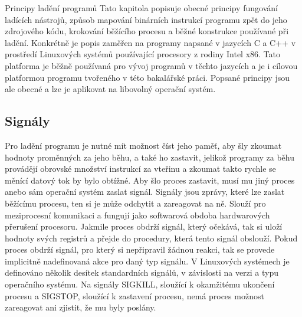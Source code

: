 \documentclass[bc,male,python,dept460]{diploma}						%
\begin{document}
\begin{section}{Principy ladění programů}
\label{sec:DebuggingPrinciples}
	Tato kapitola popisuje obecné principy fungování ladících nástrojů, způsob mapování binárních instrukcí programu zpět do jeho zdrojového kódu,
	krokování běžícího procesu a běžné konstrukce používané při ladění. Konkrétně je popis zaměřen na programy napsané v jazycích C a C++
	v prostředí Linuxových systémů používající procesory z rodiny Intel x86. Tato platforma je běžně používaná pro vývoj programů v těchto jazycích a
	je i cílovou platformou programu tvořeného v této bakalářské práci.
	Popsané principy jsou ale obecné a lze je aplikovat na libovolný operační systém.
		
	\subsection{Signály}
		Pro ladění programu je nutné mít možnost číst jeho paměť, aby šly zkoumat hodnoty proměnných za jeho běhu, a také ho zastavit, jelikož
		programy za běhu provádějí obrovské množství instrukcí za vteřinu a zkoumat takto rychle se měnící datový tok by bylo obtížné.
		Aby šlo proces zastavit, musí mu jiný proces anebo sám operační systém zaslat signál.
		Signály jsou zprávy, které lze zaslat běžícímu procesu, ten si je může odchytit a zareagovat na ně.\cite[21]{tanenbaum}
		Slouží pro meziprocesní komunikaci a fungují jako softwarová obdoba hardwarových přerušení procesoru.
		Jakmile proces obdrží signál, který očekává, tak si uloží hodnoty svých registrů a přejde do procedury, která tento signál obslouží.
		Pokud proces obdrží signál, pro který si nepřipravil žádnou reakci, tak se provede implicitně nadefinovaná akce pro daný typ signálu.
		V Linuxových systémech je definováno několik desítek standardních signálů, v závislosti na verzi a typu operačního systému.
		Na signály SIGKILL, sloužící k okamžitému ukončení procesu a SIGSTOP, sloužící k zastavení procesu, nemá proces možnost zareagovat ani
		zjistit, že mu byly poslány.
	

\end{section}
\end{document}
